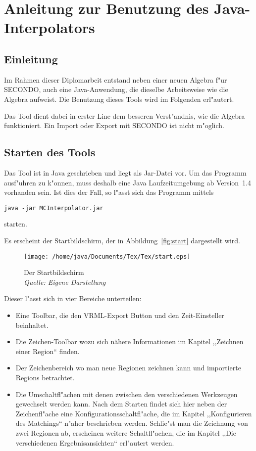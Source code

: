
\chapter{Anleitung zur Benutzung des Java-Interpolators}\label{Handbuch}
\minitoc
\newpage
\section{Einleitung}
Im Rahmen dieser Diplomarbeit entstand neben einer neuen Algebra f"ur SECONDO, auch eine Java-Anwendung, die dieselbe Arbeitsweise wie die Algebra aufweist. Die Benutzung dieses Tools wird im Folgenden erl"autert.

Das Tool dient dabei in erster Line dem besseren Verst"andnis, wie die Algebra funktioniert. Ein Import oder Export mit SECONDO ist nicht m"oglich.

\section{Starten des Tools}
Das Tool ist in Java geschrieben und liegt als Jar-Datei vor. Um das Programm ausf"uhren zu k"onnen, muss deshalb eine Java Laufzeitumgebung ab Version~1.4 vorhanden sein. Ist dies der Fall, so l"asst sich das Programm mittels \begin{verbatim}
java -jar MCInterpolator.jar
\end{verbatim}  starten.

Es erscheint der Startbildschirm, der in Abbildung~\vref{fig:start} dargestellt wird.

\begin{figure}[ht]
   \centering
   \texttt{[image: /home/java/Documents/Tex/Tex/start.eps]}
   \caption[Startbildschirm]{Der Startbildschirm \\\textit{Quelle: Eigene Darstellung}}
   \label{fig:start}
\end{figure}

Dieser l"asst sich in vier Bereiche unterteilen:
\begin{itemize}
\item Eine Toolbar, die den VRML-Export Button und den Zeit-Einsteller beinhaltet. 
\item Die Zeichen-Toolbar wozu sich nähere Informationen im Kapitel ,,Zeichnen einer Region`` finden.
\item Der Zeichenbereich wo man neue Regionen zeichnen kann und importierte Regions betrachtet.
\item Die Umschaltfl"achen  mit denen zwischen den verschiedenen Werkzeugen gewechselt werden kann. Nach dem Starten findet sich hier neben der Zeichenfl"ache eine Konfigurationsschaltfl"ache, die im Kapitel ,,Konfigurieren des Matchings`` n"aher beschrieben werden. Schlie"st man die Zeichnung von zwei Regionen ab, erscheinen weitere Schaltfl"achen, die im Kapitel ,,Die verschiedenen Ergebnisansichten`` erl"autert werden.
\end{itemize} 



